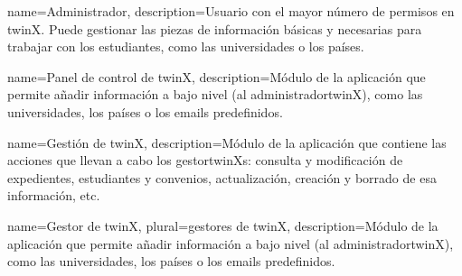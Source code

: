 {
name=Administrador,
description={Usuario con el mayor número de permisos en twinX. Puede gestionar las piezas de información básicas y necesarias para trabajar con los estudiantes, como las universidades o los países.}
}

{
	name=Panel de control de twinX,
	description={Módulo de la aplicación que permite añadir información a bajo nivel (al \gls{administradortwinX}), como las universidades, los países o los emails predefinidos.}
}

{
	name=Gestión de twinX,
	description={Módulo de la aplicación que contiene las acciones que llevan a cabo los \glspl{gestortwinX}: consulta y modificación de expedientes, estudiantes y convenios, actualización, creación y borrado de esa información, etc.}
}

{
	name=Gestor de twinX,
	plural=gestores de twinX,
	description={Módulo de la aplicación que permite añadir información a bajo nivel (al \gls{administradortwinX}), como las universidades, los países o los emails predefinidos.}
}

\glsaddall